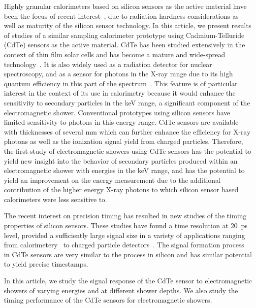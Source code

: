 Highly granular calorimeters based on silicon sensors as the active material 
have been the focus of recent interest~\cite{Adloff:2009,Butler:2020886}, due to
radiation hardness considerations as well as maturity of the silicon sensor
technology. In this article, we present results of studies of a similar
sampling calorimeter prototype using Cadmium-Telluride (CdTe) sensors as the 
active material. CdTe has been studied extensively in the context
of thin film solar cells and has become a mature and wide-spread
technology~\cite{cdtegeneric}. It is also widely used as a radiation
detector for nuclear spectroscopy, and as a sensor for photons in the X-ray range 
due to its high quantum efficiency in this part of the 
spectrum~\cite{cdtesensorsgeneric,cdtesensors1,cdtesensors2,cdtesensors3}.
This feature is of particular interest in the context of its use
in calorimetry because it would enhance the sensitivity to secondary particles in the keV range, 
a significant component of the electromagnetic shower. Conventional prototypes 
using silicon sensors have limited sensitivity to photons in this energy range. 
CdTe sensors are available with thicknesses of several mm which can further enhance the 
efficiency for X-ray photons as well as the ionization signal yield from charged particles.
Therefore, the first study of electromagnetic
showers using CdTe sensors has the potential to yield new insight
into the behavior of secondary particles produced within an 
electromagnetic shower with energies in the keV range, and has the potential
to yield an improvement on the energy measurement due to
the additional contribution of the higher energy X-ray photons to which silicon sensor
based calorimeters were less sensitive to.

The recent interest on precision timing has resulted in new studies of 
the timing properties of silicon sensors. 
These studies have found a time resolution 
at $20$~ps level, provided a sufficiently large signal size
in a variety of applications ranging from calorimetery~\cite{SiliconTiming} to 
charged particle detectors~\cite{santacruz}. The signal formation process
in CdTe sensors are very similar to the process in silicon and has 
similar potential to yield precise timestamps.

In this article, we study the signal response of the CdTe sensor to electromagnetic
showers of varying energies and at different shower depths. We also study the timing
performance of the CdTe sensors for electromagnetic showers.

